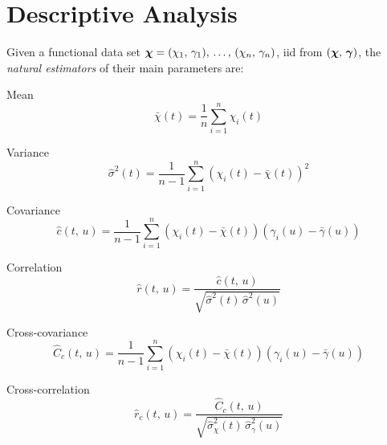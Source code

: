 \section{Descriptive Analysis}

Given a functional data set ${\boldsymbol{\chi}} = (\chi_1,\, \gamma_1),\, \dots,\, (\chi_n,\, \gamma_n)$, iid
from $({\boldsymbol{\chi}},\,{\boldsymbol{\gamma}})$, the \emph{natural estimators} of their main parameters are:

\begin{definition}{Mean}{}
	\begin{equation*}
		\bar \chi (t) = \frac{1}{n} \sum_{i=1}^n \chi_i(t) \tag{mean}
	\end{equation*}
\end{definition}
\begin{definition}{Variance}{}
	\begin{equation*}
		\hat \sigma^2(t) = \frac{1}{n-1} \sum_{i=1}^n \left( \chi_i(t) - \bar \chi(t) \right)^2 \tag{variance}
	\end{equation*}
\end{definition}
\begin{definition}{Covariance}{}
	\begin{equation*}
		\hat c(t,\,u) = \frac{1}{n-1} \sum_{i=1}^n \left( \chi_i(t) - \bar \chi(t) \right) \left( \gamma_i(u) - \bar \gamma(u) \right) \tag{covariance}
	\end{equation*}
\end{definition}
\begin{definition}{Correlation}{}
	\begin{equation*}
		\hat r(t,\,u) = \frac{\hat c(t,\,u)}{\sqrt{\hat \sigma^2(t)\,\hat \sigma^2(u)}} \tag{correlation}
	\end{equation*}
\end{definition}
\begin{definition}{Cross-covariance}{}
	\begin{equation*}
		\hat C_c(t,\,u) = \frac{1}{n-1} \sum_{i=1}^n \left( \chi_i(t) - \bar \chi(t) \right) \left( \gamma_i(u) - \bar \gamma(u) \right) \tag{cross-covariance}
	\end{equation*}
\end{definition}
\begin{definition}{Cross-correlation}{}
	\begin{equation*}
		\hat r_c(t,\,u) = \frac{\hat C_c(t,\,u)}{\sqrt{\hat \sigma_\chi^2(t)\,\hat \sigma_\gamma^2(u)}} \tag{cross-correlation}
	\end{equation*}
\end{definition}


